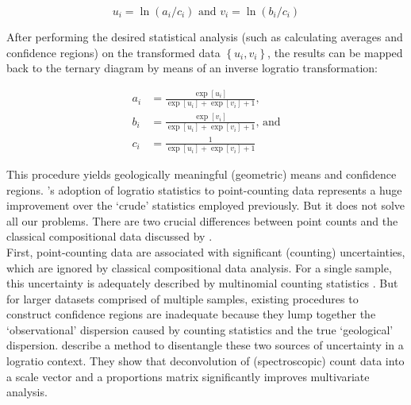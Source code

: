 \documentclass{article}
\begin{document}
\begin{equation}
  u_i = \ln(a_i/c_i) \mbox{~and~} v_i = \ln(b_i/c_i)
  \label{eq:alr}
\end{equation}

After performing the desired statistical analysis (such as calculating
averages and confidence regions) on the transformed data
$\left\{u_i,v_i\right\}$, the results can be mapped back to the
ternary diagram by means of an inverse logratio transformation:

\begin{equation}
  \begin{split}
  a_i & = \frac{\exp[u_i]}{\exp[u_i] + \exp[v_i] + 1} \mbox{,}\\
  b_i & = \frac{\exp[v_i]}{\exp[u_i] + \exp[v_i] + 1} \mbox{, and}\\
  c_i & = \frac{1}{\exp[u_i] + \exp[v_i] + 1}
  \end{split}
  \label{eq:ialr}
\end{equation}

This procedure yields geologically meaningful (geometric) means and
confidence regions. \citet{weltje2002}'s adoption of logratio
statistics to point-counting data represents a huge improvement over
the `crude' statistics employed previously. But it does not solve all
our problems.  There are two crucial differences between point counts
and the classical compositional data discussed by
\citet{aitchison1982,aitchison1986}.\\

First, point-counting data are associated with significant (counting)
uncertainties, which are ignored by classical compositional data
analysis. For a single sample, this uncertainty is adequately
described by multinomial counting statistics \citep[Section~6
  of][]{weltje2002}. But for larger datasets comprised of multiple
samples, existing procedures to construct confidence regions \citep[as
  discussed in Section~7 of][]{weltje2002} are inadequate because they
lump together the `observational' dispersion caused by counting
statistics and the true `geological' dispersion. \citet{bloemsma2015}
describe a method to disentangle these two sources of uncertainty in a
logratio context. They show that deconvolution of (spectroscopic)
count data into a scale vector and a proportions matrix significantly
improves multivariate analysis.\\
\end{document}
